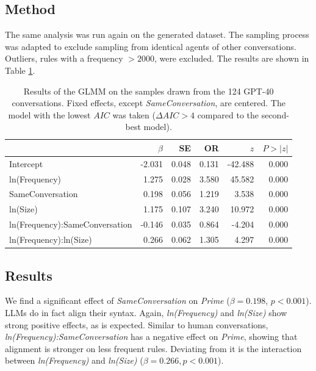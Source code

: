 \documentclass[11pt]{article}
\begin{document}
\subsection{Method}
The same analysis was run again on the generated dataset. The sampling process was adapted to exclude sampling from identical agents of other conversations. Outliers, rules with a frequency $>2000$, were excluded. The results are shown in Table \ref{tab:llm}.

\begin{table}
  \centering
  \begin{tabular}{lrrrrr}
    \hline
    &$\beta$&SE&OR& $z$& $P>|z|$\\
    \hline
    Intercept&
    -2.031&0.048& 0.131&-42.488&0.000\\
    
    ln(Frequency)&
    1.275&0.028&3.580&45.582&0.000\\
    
    SameConversation&
    0.198&0.056&1.219&3.538&0.000\\
    
    ln(Size)&
    1.175&0.107&3.240&10.972&0.000\\
    ln(Frequency):SameConversation&
    -0.146&0.035&0.864&-4.204&0.000\\
    ln(Frequency):ln(Size)&
    0.266&0.062&1.305&4.297&0.000\\
    \hline
    
  \end{tabular}
  \caption{\label{tab:llm}
  Results of the GLMM on the samples drawn from the 124 GPT-40 conversations. Fixed effects, except \textit{SameConversation}, are centered. The model with the lowest $AIC$ was taken ($\Delta AIC>4$ compared to the second-best model).}
  

\end{table}

\subsection{Results}
We find a significant effect of \textit{SameConversation} on \textit{Prime} ($\beta = 0.198$, $p < 0.001$). LLMs do in fact align their syntax. Again, \textit{ln(Frequency)} and \textit{ln(Size)} show strong positive effects, as is expected. Similar to human conversations, \textit{ln(Frequency):SameConversation} has a negative effect on \textit{Prime}, showing that alignment is stronger on less frequent rules. Deviating from it is the interaction between \textit{ln(Frequency)} and \textit{ln(Size)} ($\beta=0.266, p<0.001$).
\end{document}
